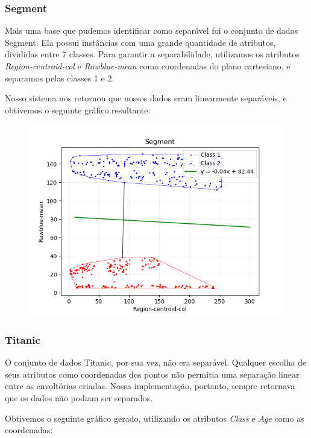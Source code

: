 \documentclass{article}
\begin{document}
\subsubsection{Segment}

Mais uma base que pudemos identificar como separável foi o conjunto de dados Segment. Ela possui instâncias com uma grande quantidade de atributos, divididas entre 7 classes. Para garantir a separabilidade, utilizamos os atributos \textit{Region-centroid-col} e \textit{Rawblue-mean} como coordenadas do plano cartesiano, e separamos pelas classes 1 e 2.

Nosso sistema nos retornou que nossos dados eram linearmente separáveis, e obtivemos o seguinte gráfico resultante:

\begin{figure} [H]
	\includegraphics[width=12cm]{segment.png}
	\centering
\end{figure}

\subsubsection{Titanic}

O conjunto de dados Titanic, por sua vez, não era separável. Qualquer escolha de seus atributos como coordenadas dos pontos não permitia uma separação linear entre as envoltórias criadas. Nossa implementação, portanto, sempre retornava que os dados não podiam ser separados.

Obtivemos o seguinte gráfico gerado, utilizando os atributos \textit{Class} e \textit{Age} como as coordenadas:
\end{document}
